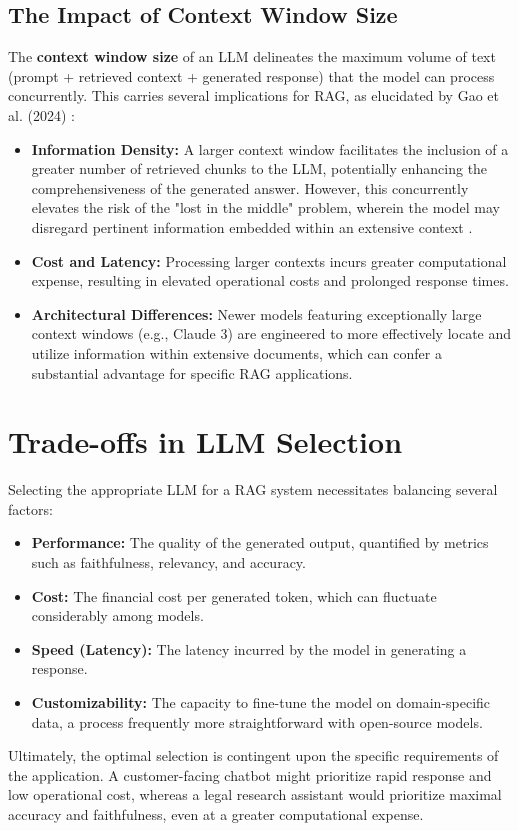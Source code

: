 \subsection{The Impact of Context Window Size}
The \textbf{context window size} of an LLM delineates the maximum volume of text (prompt + retrieved context + generated response) that the model can process concurrently. This carries several implications for RAG, as elucidated by Gao et al. (2024) \autocite{gao2024retrievalaugmented}:
\begin{itemize}
    \item \textbf{Information Density:} A larger context window facilitates the inclusion of a greater number of retrieved chunks to the LLM, potentially enhancing the comprehensiveness of the generated answer. However, this concurrently elevates the risk of the "lost in the middle" problem, wherein the model may disregard pertinent information embedded within an extensive context \autocite{liu2023lost}.
    \item \textbf{Cost and Latency:} Processing larger contexts incurs greater computational expense, resulting in elevated operational costs and prolonged response times.
    \item \textbf{Architectural Differences:} Newer models featuring exceptionally large context windows (e.g., Claude 3) are engineered to more effectively locate and utilize information within extensive documents, which can confer a substantial advantage for specific RAG applications.
\end{itemize}

\section{Trade-offs in LLM Selection}
Selecting the appropriate LLM for a RAG system necessitates balancing several factors:
\begin{itemize}
    \item \textbf{Performance:} The quality of the generated output, quantified by metrics such as faithfulness, relevancy, and accuracy.
    \item \textbf{Cost:} The financial cost per generated token, which can fluctuate considerably among models.
    \item \textbf{Speed (Latency):} The latency incurred by the model in generating a response.
    \item \textbf{Customizability:} The capacity to fine-tune the model on domain-specific data, a process frequently more straightforward with open-source models.
\end{itemize}

Ultimately, the optimal selection is contingent upon the specific requirements of the application. A customer-facing chatbot might prioritize rapid response and low operational cost, whereas a legal research assistant would prioritize maximal accuracy and faithfulness, even at a greater computational expense.
